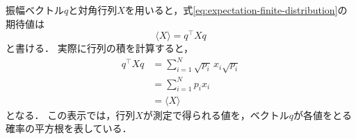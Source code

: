振幅ベクトル$q$と対角行列$X$を用いると，式\eqref{eq:expectation-finite-distribution}の期待値は
\begin{equation}
  \langle X\rangle=q^\top Xq
  \label{eq:classical-expectation-matrix-form}
\end{equation}
と書ける\cite[p.~94]{schuld2020}．
実際に行列の積を計算すると，
\begin{equation*}
  \begin{aligned}
    q^\top Xq
    &=\sum_{i=1}^{N}\sqrt{p_i}\,x_i\sqrt{p_i}\\
    &=\sum_{i=1}^{N}p_i x_i\\
    &=\langle X\rangle
  \end{aligned}
\end{equation*}
となる．
この表示では，行列$X$が測定で得られる値を，ベクトル$q$が各値をとる確率の平方根を表している．





